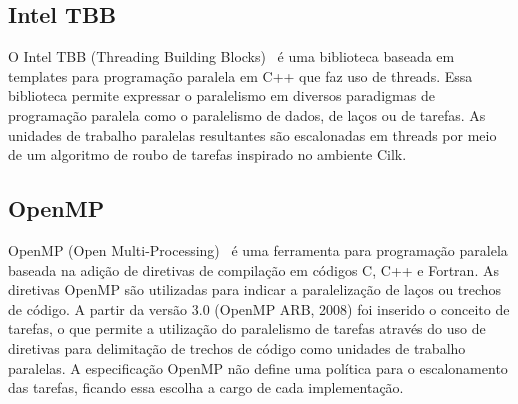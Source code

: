 \subsection{Intel TBB}

O Intel TBB (Threading Building Blocks)~\cite{Kim:2011:MDP:1920042.1920078} é uma biblioteca baseada em templates para programação paralela em C++ que faz uso de threads. Essa biblioteca permite expressar o paralelismo em diversos paradigmas de programação paralela como o paralelismo de dados, de laços ou de tarefas. As unidades de trabalho paralelas resultantes são escalonadas em threads por meio de um algoritmo de roubo de tarefas inspirado no ambiente Cilk.

\subsection{OpenMP}

OpenMP (Open Multi-Processing)~\cite{Quinn:2003:PPC:1211440} é uma ferramenta para programação paralela baseada na adição de diretivas de compilação em códigos C, C++ e Fortran. As diretivas OpenMP são utilizadas para indicar a paralelização de laços ou trechos de código. A partir da versão 3.0 (OpenMP ARB, 2008) foi inserido o conceito de tarefas, o que permite a utilização do paralelismo de tarefas através do uso de diretivas para delimitação de trechos de código como unidades de trabalho paralelas. A especificação OpenMP não define uma política para o escalonamento das tarefas, ficando essa escolha a cargo de cada implementação.
